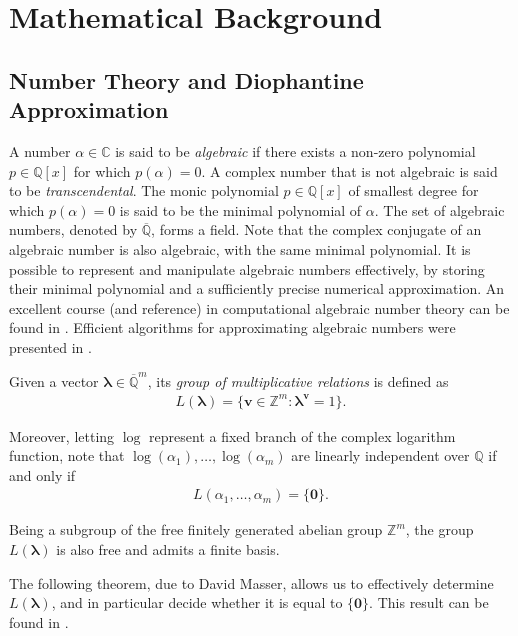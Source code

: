 \section{Mathematical Background}
\label{background}

\subsection{Number Theory and Diophantine Approximation}

A number $\alpha \in \mathbb{C}$ is said to be \emph{algebraic} if
there exists a non-zero polynomial $p \in \mathbb{Q}[x]$ for which
$p(\alpha) = 0$. A complex number that is not algebraic is said to be
\emph{transcendental}. The monic polynomial $p \in \mathbb{Q}[x]$ of
smallest degree for which $p(\alpha) = 0$ is said to be the minimal
polynomial of $\alpha$. The set of algebraic numbers, denoted by
$\overline{\mathbb{Q}}$, forms a field. Note that the complex
conjugate of an algebraic number is also algebraic, with the same
minimal polynomial. It is possible to represent and manipulate
algebraic numbers effectively, by storing their minimal polynomial and
a sufficiently precise numerical approximation. An excellent course
(and reference) in computational algebraic number theory can be found
in \cite{Cohen}. Efficient algorithms for approximating algebraic
numbers were presented in \cite{Pan}.

Given a vector $\boldsymbol{\lambda} \in \overline{\mathbb{Q}}^{m}$, its \emph{group of multiplicative relations} is defined as
\begin{align*}
L(\boldsymbol{\lambda}) = \lbrace \boldsymbol{v} \in \mathbb{Z}^{m} : \boldsymbol{\lambda}^{\boldsymbol{v}} = 1 \rbrace .
\end{align*}

Moreover, letting $\log$ represent a fixed branch of the complex logarithm function, note that $\log(\alpha_{1}), \ldots, \log(\alpha_{m})$ are linearly independent over $\mathbb{Q}$ if and only if
\begin{align*}
L(\alpha_{1}, \ldots, \alpha_{m}) = \lbrace \boldsymbol{0} \rbrace .
\end{align*}

Being a subgroup of the free finitely generated abelian group $\mathbb{Z}^{m}$, the group $L(\boldsymbol{\lambda})$ is also free and admits a finite basis.

The following theorem, due to David Masser, allows us to effectively determine $L(\boldsymbol{\lambda})$, and in particular decide whether it is equal to $\lbrace \boldsymbol{0} \rbrace$. This result can be found in \cite{Masser}.

